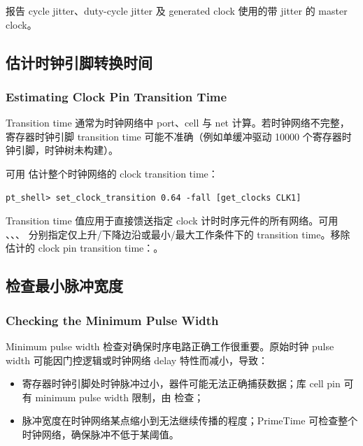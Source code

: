  报告 cycle jitter、duty-cycle jitter 及 generated clock 使用的带 jitter 的 master clock。

\subsection{估计时钟引脚转换时间}
\subsubsection*{Estimating Clock Pin Transition Time}

Transition time 通常为时钟网络中 port、cell 与 net 计算。若时钟网络不完整，寄存器时钟引脚 transition time 可能不准确（例如单缓冲驱动 10000 个寄存器时钟引脚，时钟树未构建）。

可用  估计整个时钟网络的 clock transition time：
\begin{lstlisting}
pt_shell> set_clock_transition 0.64 -fall [get_clocks CLK1]
\end{lstlisting}

Transition time 值应用于直接馈送指定 clock 计时时序元件的所有网络。可用 、、、 分别指定仅上升/下降边沿或最小/最大工作条件下的 transition time。移除估计的 clock pin transition time：。

\subsection{检查最小脉冲宽度}
\subsubsection*{Checking the Minimum Pulse Width}

Minimum pulse width 检查对确保时序电路正确工作很重要。原始时钟 pulse width 可能因门控逻辑或时钟网络 delay 特性而减小，导致：
\begin{itemize}
  \item 寄存器时钟引脚处时钟脉冲过小，器件可能无法正确捕获数据；库 cell pin 可有 minimum pulse width 限制，由  检查；
  \item 脉冲宽度在时钟网络某点缩小到无法继续传播的程度；PrimeTime 可检查整个时钟网络，确保脉冲不低于某阈值。
\end{itemize}


